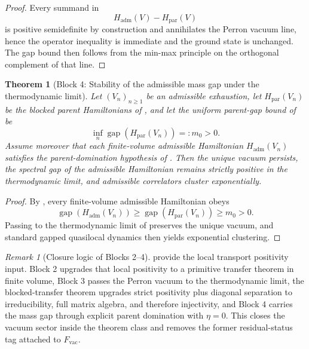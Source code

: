 \documentclass[11pt,a4paper]{article}
\newtheorem{theorem}{Theorem}[section]
\theoremstyle{definition}
\theoremstyle{remark}
\newtheorem*{remark}{Remark}
\begin{document}
\begin{proof}
Every summand in
\[
H_{\mathrm{adm}}(V)-H_{\mathrm{par}}(V)
\]
is positive semidefinite by construction and annihilates the Perron vacuum line, hence the operator
inequality is immediate and the ground state is unchanged. The gap bound then follows from the
min-max principle on the orthogonal complement of that line.
\end{proof}

\begin{theorem}[Block 4: Stability of the admissible mass gap under the thermodynamic limit]
\label{thm:gap-stability-thermo-limit}
Let $(V_n)_{n\ge 1}$ be an admissible exhaustion, let $H_{\mathrm{par}}(V_n)$ be the blocked
parent Hamiltonians of , and let the uniform parent-gap
bound of  be
\[
\inf_n \operatorname{gap}(H_{\mathrm{par}}(V_n))=:m_0>0.
\]
Assume moreover that each finite-volume admissible Hamiltonian $H_{\mathrm{adm}}(V_n)$ satisfies
the parent-domination hypothesis of . Then the unique vacuum
persists, the spectral gap of the admissible Hamiltonian remains strictly positive in the
thermodynamic limit, and admissible
correlators cluster exponentially.
\end{theorem}

\begin{proof}
By , every finite-volume admissible Hamiltonian obeys
\[
\operatorname{gap}(H_{\mathrm{adm}}(V_n))
\ge
\operatorname{gap}(H_{\mathrm{par}}(V_n))
\ge
m_0>0.
\]
Passing to the thermodynamic limit of  preserves the unique vacuum,
and standard gapped quasilocal dynamics then yields exponential clustering.
\end{proof}

\begin{remark}[Closure logic of Blocks 2--4]
\label{rem:vacuum-honest-status}
 provide the local transport
positivity input. Block 2 upgrades that local positivity to a primitive transfer theorem in finite
volume, Block 3 passes the Perron vacuum to the thermodynamic limit, the blocked-transfer theorem
upgrades strict positivity plus diagonal separation to irreducibility, full matrix algebra, and
therefore injectivity, and Block 4 carries the mass gap through explicit parent domination with
$\eta=0$. This closes the vacuum sector inside the theorem class and removes the former
residual-status tag attached to $F_{\mathrm{vac}}$.
\end{remark}
\end{document}

